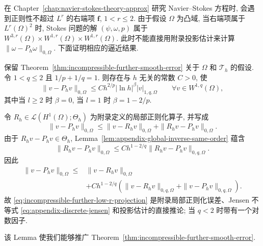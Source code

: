 在 Chapter~\ref{chap:navier-stokes-theory-approx} 研究 Navier--Stokes 方程时,
会遇到正则性不超过 $L^r$ 的右端项 $\mathbf f$, $1<r\leq2$.
由于假设 $\Omega$ 为凸域, 当右端项属于 $L^r(\Omega)^2$ 时,
Stokes 问题的解 $(\psi,\omega,p)$ 属于
$W^{3,r}(\Omega)\times W^{1,r}(\Omega)\times W^{1,r}(\Omega)$.
此时不能直接用附录投影估计来计算
$\|\omega-P_h\omega\|_{0,\Omega}$.
下面证明相应的逼近结果.

\begin{Lemma}\label{lem:incompressible-further-low-r-projection}
保留 Theorem~\ref{thm:incompressible-further-smooth-error}
关于 $\Omega$ 和 $\mathcal T_h$ 的假设.
令 $1<q\leq2$ 且 $1/p+1/q=1$.
则存在与 $h$ 无关的常数 $C>0$, 使
\begin{equation}\label{eq:incompressible-further-low-r-projection}
\|v-P_hv\|_{0,\Omega}
\leq Ch^{2/p}|\ln h|^\beta|v|_{1,q,\Omega}
\qquad\forall v\in W^{1,q}(\Omega),
\end{equation}
其中当 $l\geq2$ 时 $\beta=0$,
当 $l=1$ 时 $\beta=1-2/p$.
\end{Lemma}

\begin{Proof}
令 $R_h\in\mathcal L(H^1(\Omega);\Theta_h)$
为附录定义的局部正则化算子, 并写成
\[
\|v-P_hv\|_{0,\Omega}
\leq\|v-R_hv\|_{0,\Omega}
+\|R_hv-P_hv\|_{0,\Omega}.
\]
由于 $R_hv-P_hv\in\Theta_h$,
Lemma~\ref{lem:appendix-global-inverse-same-order} 蕴含
\[
\|R_hv-P_hv\|_{0,\Omega}
\leq Ch^{1-2/q}\|R_hv-P_hv\|_{0,q,\Omega}.
\]
因此
\[
\begin{split}
\|v-P_hv\|_{0,\Omega}
\leq{}&\|v-R_hv\|_{0,\Omega}\\
&+Ch^{1-2/q}
\left(\|v-R_hv\|_{0,q,\Omega}
+\|v-P_hv\|_{0,q,\Omega}\right).
\end{split}
\]
故 \eqref{eq:incompressible-further-low-r-projection}
是附录局部正则化误差、Jensen 不等式
\eqref{eq:appendix-discrete-jensen}
和投影估计的直接推论; 当 $q<2$ 时带有一个对数因子.
\end{Proof}

该 Lemma 使我们能够推广
Theorem~\ref{thm:incompressible-further-smooth-error}.

